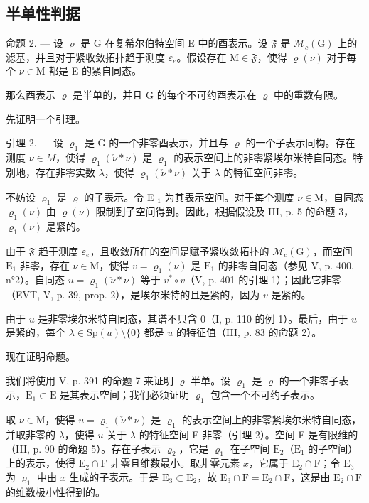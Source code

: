\subsection{半单性判据}

命题 2. --- 设 \(\varrho\) 是 G 在复希尔伯特空间 E 中的酉表示。设 \(\mathfrak{F}\) 是 \(\mathcal{M}_{c}(\mathrm{G})\) 上的滤基，并且对于紧收敛拓扑趋于测度 \(\varepsilon_{e}\)。假设存在 \(\mathrm{M} \in \mathfrak{F}\)，使得 \(\varrho(\nu)\) 对于每个 \(\nu \in \mathrm{M}\) 都是 E 的紧自同态。

那么酉表示 \(\varrho\) 是半单的，并且 G 的每个不可约酉表示在 \(\varrho\) 中的重数有限。

先证明一个引理。

引理 2. --- 设 \(\varrho_{1}\) 是 G 的一个非零酉表示，并且与 \(\varrho\) 的一个子表示同构。存在测度 \(\nu \in M\)，使得 \(\varrho_{1}(\check{\nu} * \nu)\) 是 \(\varrho_{1}\) 的表示空间上的非零紧埃尔米特自同态。特别地，存在非零实数 \(\lambda\)，使得 \(\varrho_{1}(\check{\nu} * \nu)\) 关于 \(\lambda\) 的特征空间非零。

不妨设 \(\varrho_{1}\) 是 \(\varrho\) 的子表示。令 E \(_{1}\) 为其表示空间。对于每个测度 \(\nu \in \mathrm{M}\)，自同态 \(\varrho_{1}(\nu)\) 由 \(\varrho(\nu)\) 限制到子空间得到。因此，根据假设及 III, p. 5 的命题 3，\(\varrho_{1}(\nu)\) 是紧的。

由于 \(\mathfrak{F}\) 趋于测度 \(\varepsilon_{e}\)，且收敛所在的空间是赋予紧收敛拓扑的 \(\mathcal{M}_{c}(\mathrm{G})\)，而空间 \(\mathrm{E}_{1}\) 非零，存在 \(\nu\in\mathrm{M}\)，使得 \(v=\varrho_{1}(\nu)\) 是 \(\mathrm{E}_{1}\) 的非零自同态（参见 V, p. 400, n°2）。自同态 \(u=\varrho_{1}(\check{\nu}*\nu)\) 等于 \(v^{*}\circ v\)（V, p. 401 的引理 1）；因此它非零（EVT, V, p. 39, prop. 2），是埃尔米特的且是紧的，因为 \(v\) 是紧的。

由于 \(u\) 是非零埃尔米特自同态，其谱不只含 0（I, p. 110 的例 1）。最后，由于 \(u\) 是紧的，每个 \(\lambda \in \mathrm{Sp}(u)\setminus\{0\}\) 都是 \(u\) 的特征值（III, p. 83 的命题 2）。

现在证明命题。

我们将使用 V, p. 391 的命题 7 来证明 \(\varrho\) 半单。设 \(\varrho_{1}\) 是 \(\varrho\) 的一个非零子表示，\(\mathrm{E}_{1} \subset \mathrm{E}\) 是其表示空间；我们必须证明 \(\varrho_{1}\) 包含一个不可约子表示。

取 \(\nu \in \mathrm{M}\)，使得 \(u = \varrho_{1}(\check{\nu}*\nu)\) 是 \(\varrho_{1}\) 的表示空间上的非零紧埃尔米特自同态，并取非零的 \(\lambda\)，使得 \(u\) 关于 \(\lambda\) 的特征空间 F 非零（引理 2）。空间 F 是有限维的（III, p. 90 的命题 5）。存在子表示 \(\varrho_{2}\)，它是 \(\varrho_{1}\) 在子空间 \(\mathrm{E}_{2}\)（\(\mathrm{E}_{1}\) 的子空间）上的表示，使得 \(\mathrm{E}_{2} \cap \mathrm{F}\) 非零且维数最小。取非零元素 \(x\)，它属于 \(\mathrm{E}_{2} \cap \mathrm{F}\)；令 \(\mathrm{E}_{3}\) 为 \(\varrho_{1}\) 中由 \(x\) 生成的子表示。于是 \(\mathrm{E}_{3} \subset \mathrm{E}_{2}\)，故 \(\mathrm{E}_{3} \cap \mathrm{F} = \mathrm{E}_{2} \cap \mathrm{F}\)，这是由 \(\mathrm{E}_{2} \cap \mathrm{F}\) 的维数极小性得到的。

